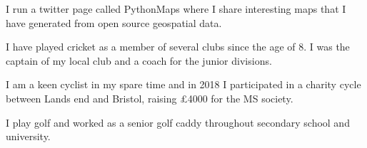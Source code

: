 \begin{cventries}
  \cventry
    {}
    {}
    {}
    {}
    {
      \begin{cvitems}
        \item {I run a twitter page called PythonMaps where I share interesting maps that I have generated from open source geospatial data.}
        \item {I have played cricket as a member of several clubs since the age of 8. I was the captain of my local club and a coach for the junior divisions.}
        \item {I am a keen cyclist in my spare time and in 2018 I participated in a charity cycle between Lands end and Bristol, raising £4000 for the MS society.}
        \item {I play golf and worked as a senior golf caddy throughout secondary school and university.}
      \end{cvitems}
    }
\end{cventries}
